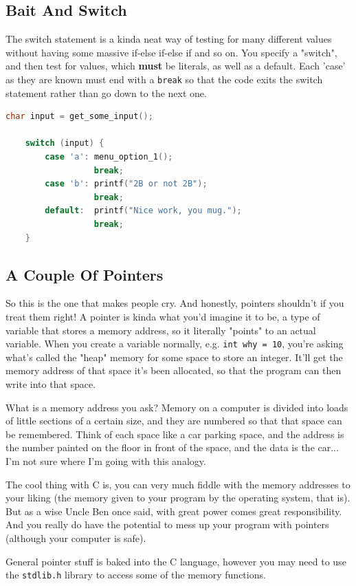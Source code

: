 \subsection{Bait And Switch}
The switch statement is a kinda neat way of testing for many different values without having some massive if-else if-else if and so on. You specify a "switch", and then test for values, which \textbf{must} be literals, as well as a default. Each 'case' as they are known must end with a \texttt{break} so that the code exits the switch statement rather than go down to the next one.
\begin{lstlisting}[language=C]
    char input = get_some_input();

    switch (input) {
        case 'a': menu_option_1();
                  break;
        case 'b': printf("2B or not 2B");
                  break;
        default:  printf("Nice work, you mug.");
                  break;
    }
\end{lstlisting}

\subsection{A Couple Of Pointers}
So this is the one that makes people cry. And honestly, pointers shouldn't if you treat them right! A pointer is kinda what you'd imagine it to be, a type of variable that stores a memory address, so it literally "points" to an actual variable. When you create a variable normally, e.g. \texttt{int why = 10}, you're asking what's called the "heap" memory for some space to store an integer. It'll get the memory address of that space it's been allocated, so that the program can then write into that space.

What is a memory address you ask? Memory on a computer is divided into loads of little sections of a certain size, and they are numbered so that that space can be remembered. Think of each space like a car parking space, and the address is the number painted on the floor in front of the space, and the data is the car... I'm not sure where I'm going with this analogy.

The cool thing with C is, you can very much fiddle with the memory addresses to your liking (the memory given to your program by the operating system, that is). But as a wise Uncle Ben once said, with great power comes great responsibility. And you really do have the potential to mess up your program with pointers (although your computer is safe).

General pointer stuff is baked into the C language, however you may need to use the \texttt{stdlib.h} library to access some of the memory functions.

